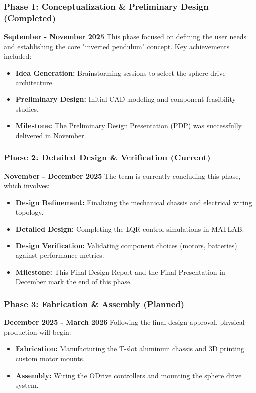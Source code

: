 \documentclass[12pt]{article}
\begin{document}
\subsubsection{Phase 1: Conceptualization \& Preliminary Design (Completed)}
\textbf{September - November 2025}
This phase focused on defining the user needs and establishing the core "inverted pendulum" concept. Key achievements included:
\begin{itemize}
    \item \textbf{Idea Generation:} Brainstorming sessions to select the sphere drive architecture.
    \item \textbf{Preliminary Design:} Initial CAD modeling and component feasibility studies.
    \item \textbf{Milestone:} The Preliminary Design Presentation (PDP) was successfully delivered in November.
\end{itemize}

\subsubsection{Phase 2: Detailed Design \& Verification (Current)}
\textbf{November - December 2025}
The team is currently concluding this phase, which involves:
\begin{itemize}
    \item \textbf{Design Refinement:} Finalizing the mechanical chassis and electrical wiring topology.
    \item \textbf{Detailed Design:} Completing the LQR control simulations in MATLAB.
    \item \textbf{Design Verification:} Validating component choices (motors, batteries) against performance metrics.
    \item \textbf{Milestone:} This Final Design Report and the Final Presentation in December mark the end of this phase.
\end{itemize}

\subsubsection{Phase 3: Fabrication \& Assembly (Planned)}
\textbf{December 2025 - March 2026}
Following the final design approval, physical production will begin:
\begin{itemize}
    \item \textbf{Fabrication:} Manufacturing the T-slot aluminum chassis and 3D printing custom motor mounts.
    \item \textbf{Assembly:} Wiring the ODrive controllers and mounting the sphere drive system.
\end{itemize}
\end{document}
